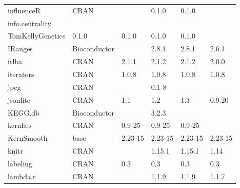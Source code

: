 \begin{longtable}{llllll}
\rowcolor{black!10}
influenceR                    & CRAN                      &             & 0.1.0       & 0.1.0          &                   \\
\rowcolor{black!5}
info.centrality               & \begin{tabular}[c]{@{}l@{}}GitHub \\ TomKellyGenetics \end{tabular}  & 0.1.0       & 0.1.0       & 0.1.0          & 0.1.0              \\
\rowcolor{black!10}
IRanges                       & Bioconductor              &             & 2.8.1       & 2.8.1          & 2.6.1             \\
\rowcolor{black!5}
irlba                         & CRAN                      & 2.1.1       & 2.1.2       & 2.1.2          & 2.0.0              \\
\rowcolor{black!10}
iterators                     & CRAN                      & 1.0.8       & 1.0.8       & 1.0.8          & 1.0.8             \\
\rowcolor{black!5}
jpeg                          & CRAN                      &             & 0.1-8       &                &                    \\
\rowcolor{black!10}
jsonlite                      & CRAN                      & 1.1         & 1.2         & 1.3            & 0.9.20            \\
\rowcolor{black!5}
KEGG.db                       & Bioconductor              &             & 3.2.3       &                &                    \\
\rowcolor{black!10}
kernlab                       & CRAN                      & 0.9-25      & 0.9-25      & 0.9-25         &                   \\
\rowcolor{black!5}
KernSmooth                    & base                      & 2.23-15     & 2.23-15     & 2.23-15        & 2.23-15            \\
\rowcolor{black!10}
knitr                         & CRAN                      &             & 1.15.1      & 1.15.1         & 1.14              \\
\rowcolor{black!5}
labeling                      & CRAN                      & 0.3         & 0.3         & 0.3            & 0.3                \\
\rowcolor{black!10}
lambda.r                      & CRAN                      &             & 1.1.9       & 1.1.9          & 1.1.7             \\

\end{longtable}
